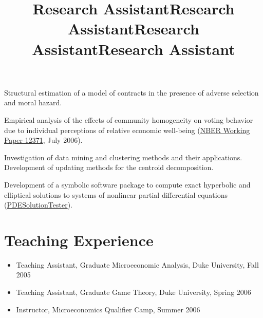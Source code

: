 \documentclass[overlapped,line,letterpaper]{res}
\begin{document}
\begin{resume}
\title{Research Assistant}
\begin{position}
  Structural estimation of a model of contracts in the presence of
  adverse selection and moral hazard.
\end{position}

\title{Research Assistant}
\begin{position}
  Empirical analysis of the effects of community homogeneity on voting
  behavior due to individual perceptions of relative economic
  well-being
  (\href{http://www.nber.org/papers/w12371}{NBER Working Paper 12371},
  July 2006).
\end{position}

\title{Research Assistant}
\begin{position}
  Investigation of data mining and clustering methods and their
  applications. Development of updating methods for the centroid
  decomposition.
\end{position}

\title{Research Assistant}
\begin{position}
  Development of a symbolic software package to compute exact
  hyperbolic and elliptical solutions to systems of nonlinear partial
  differential equations
  (\href{http://www.mines.edu/fs_home/whereman/software/PDESolutionTester/}
  {PDESolutionTester}).
\end{position}


\section{\bf Teaching Experience}

\begin{itemize}
\item Teaching Assistant, Graduate Microeconomic Analysis, Duke
  University, Fall 2005
\item Teaching Assistant, Graduate Game Theory, Duke University, Spring 2006
\item Instructor, Microeconomics Qualifier Camp, Summer 2006
\end{itemize}


\end{resume}
\end{document}
